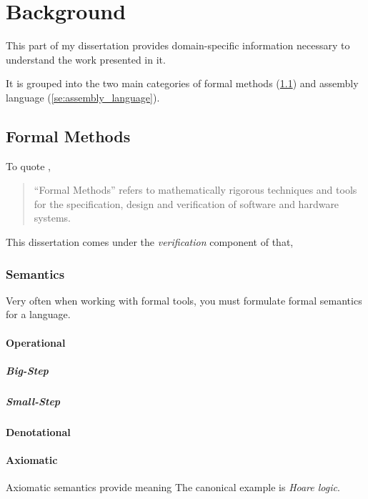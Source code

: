 \chapter{Background}\label{ch:background}
This part of my dissertation provides domain-specific information necessary to understand
the work presented in it.

It is grouped into the two main categories of
formal methods (\cref{se:formal_methods})
and assembly language (\cref{se:assembly_language}).

\section{Formal Methods}\label{se:formal_methods}
To quote \textcite{butler:fm},
\begin{quote}
  ``Formal Methods''%
  refers to mathematically rigorous techniques and tools
  for the specification, design and verification of software and hardware systems.
\end{quote}
This dissertation comes under the \emph{verification} component of that,%

\subsection{Semantics}
Very often when working with formal tools, you must formulate formal semantics
for a language.

\Textcite{schmidt2003pls}

\subsubsection{Operational}
\paragraph{Big-Step}
\paragraph{Small-Step}

\subsubsection{Denotational}

\subsubsection{Axiomatic}
Axiomatic semantics provide meaning 
The canonical example is \emph{Hoare logic}.%

